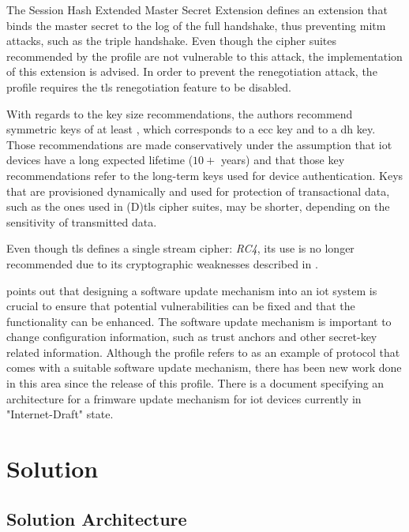 \documentclass{llncs}
\begin{document}
{The Session Hash Extended Master Secret Extension\cite{RFC7627} defines an extension
that binds the master secret to the log of the full handshake, thus preventing
\gls{mitm} attacks, such as the triple handshake\cite{TripleHa89:online}. Even though the
cipher suites recommended by the profile are not vulnerable to this attack, the
implementation of this extension is advised. In order to prevent the renegotiation
attack\cite{RFC5746}, the profile requires the \gls{tls} renegotiation feature
to be disabled.

With regards to the key size recommendations, the authors recommend symmetric keys
of at least , which corresponds to a  \gls{ecc}
key and to a  \gls{dh} key. Those recommendations are made
conservatively under the assumption that \gls{iot} devices have a long expected
lifetime ($10+$ years) and that those key recommendations refer to the long-term
keys used for device authentication. Keys that are provisioned dynamically
and used for protection of transactional data, such as the ones used in
(D)\gls{tls} cipher suites, may be shorter, depending on the sensitivity of
transmitted data.

Even though \gls{tls} defines a single stream cipher: \textit{RC4}, its use is no longer
recommended due to its cryptographic weaknesses described in \cite{RFC7465}.

\cite{RFC7925} points out that designing a software
update mechanism into an \gls{iot} system is crucial to ensure that potential vulnerabilities
can be fixed and that the functionality can be enhanced. The software update mechanism
is important to change configuration information, such as trust anchors and
other secret-key related information. Although the profile refers to \cite{OpenMobi29:online}
as an example of protocol that comes with a suitable software update mechanism,
there has been new work done in this area since the release of this profile.
There is a document specifying an architecture for a frimware update
mechanism for \gls{iot} devices\cite{I-D.moran-suit-architecture} currently in "Internet-Draft" state.

\section{Solution}

\subsection{Solution Architecture}

}
\end{document}
